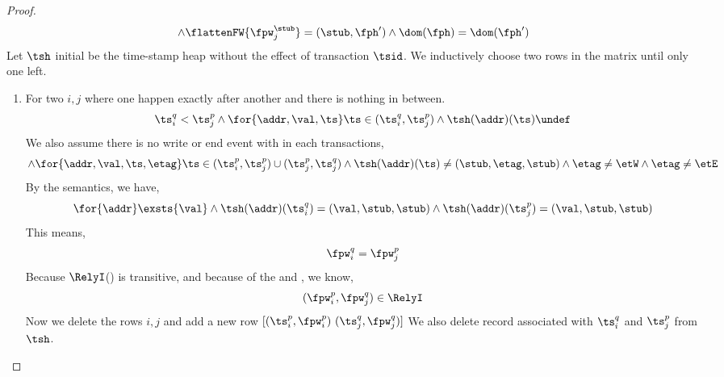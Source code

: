 \begin{proof}
\[    \land \flattenFW{\fpw_{j}^{\stub}} = (\stub, \fph')
    \land \dom(\fph) = \dom(\fph')
\]
Let \( \tsh \) initial be the time-stamp heap without the effect of transaction \( \tsid \).
We inductively choose two rows in the matrix until only one left.
\begin{enumerate}
\item For two \( i,j \) where one happen exactly after another and there is nothing in between.
\[
\ts_{i}^{q} < \ts_{j}^{p}
\land \for{\addr,\val, \ts}                             
\ts \in (\ts_{i}^{q}, \ts_{j}^{p} ) 
\land \tsh(\addr)(\ts)\undef
\]
We also assume there is no write or end event with in each transactions,
\[
\land \for{\addr,\val, \ts, \etag}                             
\ts \in (\ts_{i}^{p}, \ts_{j}^{p} )  \cup (\ts_{j}^{p}, \ts_{j}^{q})
\land \tsh(\addr)(\ts) \neq (\stub, \etag, \stub)
\land \etag \neq \etW
\land \etag \neq \etE
\]
By the semantics, we  have,
\[
\for{\addr} \exsts{\val} 
\land \tsh(\addr)(\ts_{i}^{q}) = (\val, \stub, \stub)
\land \tsh(\addr)(\ts_{j}^{p}) = (\val, \stub, \stub)
\]
This means,
\[
    \fpw_{i}^{q} = \fpw_{j}^{p}
\]
Because \( \RelyI \)() is transitive, and because of the \ih and , we know,
\[
    (\fpw_{i}^{p}, \fpw_{j}^{q}) \in \RelyI
\]
Now we delete the rows \( i,j \) and add a new row \( [ (\ts_{i}^{p}, \fpw_{i}^{p}) \  (\ts_{j}^{q}, \fpw_{j}^{q}) ] \)
We also delete record associated with \( \ts_{i}^{q} \) and \( \ts_{j}^{p} \) from \( \tsh \).


\end{enumerate}
\end{proof}
